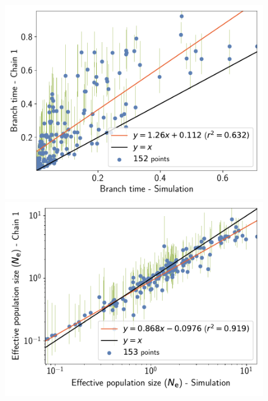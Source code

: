 \documentclass{article}
\begin{document}
\begin{figure}[H]
\begin{minipage}{0.32\linewidth}
			\includegraphics[width=\linewidth, page=1]{simulations/SimuPoly_SiteMutSelBranchNe_BranchCorrelation_BranchTime}
		\end{minipage} \hfill
		\begin{minipage}{0.32\linewidth}
			\includegraphics[width=\linewidth, page=1]{simulations/SimuPoly_SiteMutSelBranchNe_BranchCorrelation_LogPopulationSize}
		\end{minipage}
		\begin{minipage}{0.32\linewidth}

\end{minipage}
\end{figure}
\end{document}
